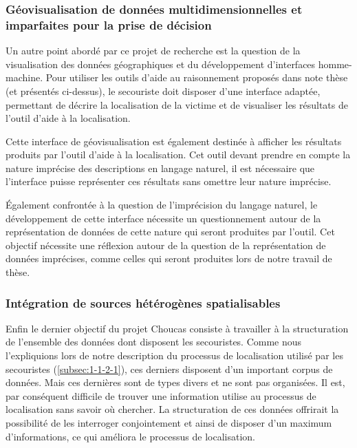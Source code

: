 \subsubsection{Géovisualisation de données multidimensionnelles et
  imparfaites pour la prise de décision}
\label{subsec:1-2-3-3}

Un autre point abordé par ce projet de recherche est la question de la
visualisation des données géographiques et du développement
d'interfaces homme-machine. Pour utiliser les outils d'aide au
raisonnement proposés dans note thèse (et présentés ci-dessus), le
secouriste doit disposer d'une interface adaptée, permettant de
décrire la localisation de la victime et de visualiser les résultats
de l'outil d'aide à la localisation. 

Cette interface de géovisualisation est également destinée à afficher
les résultats produits par l'outil d'aide à la localisation. Cet outil
devant prendre en compte la nature imprécise des descriptions en
langage naturel, il est nécessaire que l'interface puisse représenter
ces résultats sans omettre leur nature imprécise.  

Également confrontée à la question de l'imprécision du langage
naturel, le développement de cette interface nécessite un
questionnement autour de la représentation de données de cette nature
qui seront produites par l'outil. Cet objectif nécessite une réflexion
autour de la question de la représentation de données imprécises,
comme celles qui seront produites lors de notre travail de thèse.

\subsubsection{Intégration de sources hétérogènes spatialisables}
\label{subsec:1-2-3-4}

Enfin le dernier objectif du projet Choucas consiste à travailler à la
structuration de l'ensemble des données dont disposent les
secouristes. Comme nous l'expliquions lors de notre description du
processus de localisation utilisé par les secouristes
(\ref{subsec:1-1-2-1}), ces derniers disposent d'un important corpus
de données. Mais ces dernières sont de types divers et ne sont pas
organisées. Il est, par conséquent difficile de trouver une
information utilise au processus de localisation sans savoir où
chercher. La structuration de ces données offrirait la possibilité de
les interroger conjointement et ainsi de disposer d'un maximum
d'informations, ce qui améliora le processus de localisation.

